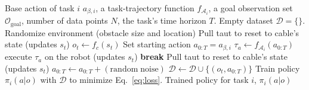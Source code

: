 \begin{algorithm}[t!]
\caption{\small Iterative traiNing for Dynamic manipulation (INDy)}
\small{
\begin{algorithmic}[1]

\label{alg:whip}
\REQUIRE Base action of task $i$ $a_{\beta, i}$, a task-trajectory function $f_{\mathcal{A}_i}$, a goal observation set $\mathcal{O}_\mathrm{goal}$, number of data points $N$, the task's time horizon $T$.
\STATE Empty dataset $\mathcal{D} = \{\}$.
    \STATE Randomize environment (obstacle size and location)
    \STATE Pull taut to reset to cable's state (updates $s_t$)
    \STATE $o_t \leftarrow f_c(s_t)$ 
    \STATE Set starting action $a_{0:T} = a_{\beta, i}$
    \LOOP
        \STATE $\tau_a \leftarrow f_{\mathcal{A}_i}(a_{0:T})$ 
        \STATE execute $\tau_a$ on the robot (updates $s_t$)
            \STATE \textbf{break} 
        \ENDIF
        \STATE Pull taut to reset to cable's state (updates $s_t$)
        \STATE $a_{0:T} \leftarrow a_{0:T} + \mathrm{(random\;noise)}$
    \ENDLOOP
    \STATE $\mathcal{D} \longleftarrow \mathcal{D} \cup \{(o_t, a_{0:T})\}$ 
\ENDFOR
\STATE Train policy $\pi_i(a|o)$ with $\mathcal{D}$ to minimize Eq.~\ref{eq:loss}.
\RETURN Trained policy for task $i$, $\pi_i(a|o)$
\end{algorithmic}
}
\end{algorithm}
%
